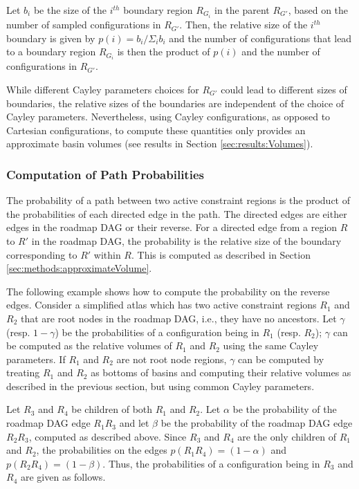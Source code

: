 \documentclass[]{article}
\begin{document}
Let $b_i$ be the size of the $i^{th}$ boundary region $R_{G_i}$ in the parent
$R_{G'}$, based on the number of sampled configurations in $R_{G'}$. Then, the
relative size of the $i^{th}$ boundary  is given by $p(i) = b_i/\Sigma_i b_i$
and the number of configurations that lead to a boundary region $R_{G_i}$ is
then the product of $p(i)$ and the number of configurations in $R_{G'}$.

While different Cayley parameters choices for $R_{G'}$ could lead to different
sizes of boundaries, the relative sizes of the boundaries are independent of
the choice of Cayley parameters.  Nevertheless, using Cayley configurations, as
opposed to Cartesian configurations, to compute these quantities only provides
an approximate basin volumes (see results in Section \ref{sec:results:Volumes}).

\subsubsection{Computation of Path Probabilities}
\label{sec:methods:PathProb}
The probability of a path between two active constraint
regions is the product of the probabilities of each directed edge in the path.
The directed edges are either edges in the roadmap DAG or their reverse.
For a directed edge from a region $R$ to $R'$ in the roadmap DAG, the probability
is the relative size of the boundary corresponding to $R'$ within $R$. This is
computed as described in Section \ref{sec:methods:approximateVolume}.

The following example shows how to compute the probability on the reverse edges.
Consider a simplified atlas which has two active constraint regions $R_1$ and $R_2$
that are root nodes in the roadmap DAG, i.e., they have no ancestors. 
Let $\gamma$ (resp. $1-\gamma$) be the probabilities of a configuration being in $R_1$ (resp. $R_2$);
$\gamma$ can be computed as the relative volumes of $R_1$ and $R_2$ using the same Cayley parameters.
If $R_1$ and $R_2$ are not root node regions, $\gamma$ can be computed by treating $R_1$ and $R_2$ 
as bottoms of basins and computing their relative volumes as described in the previous section, but
using common Cayley parameters.

Let $R_3$ and $R_4$ be children of both $R_1$ and $R_2$.
Let $\alpha$ be the probability of the roadmap DAG edge $R_1R_3$ and let $\beta$ be the probability
of the roadmap DAG edge $R_2R_3$, computed as described above. 
Since $R_3$ and $R_4$ are the only children of $R_1$ and
$R_2$, the probabilities on the edges $p(R_1R_4) = (1 - \alpha)$ and $p(R_2R_4) = (1 -
\beta)$. Thus, the probabilities of a configuration being in $R_3$ and $R_4$ are given as follows.
\end{document}
